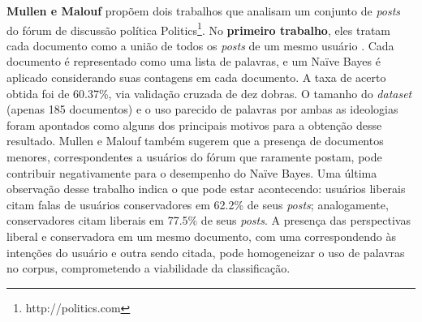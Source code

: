 \textbf{Mullen e Malouf} propõem dois trabalhos que analisam um conjunto de \emph{posts} do fórum de discussão política Politics\footnote{http://politics.com}. No \textbf{primeiro trabalho}, eles tratam cada documento como a união de todos os \emph{posts} de um mesmo usuário \cite{aaai-politics}. Cada documento é representado como uma lista de palavras, e um Naïve Bayes é aplicado considerando suas contagens em cada documento. A taxa de acerto obtida foi de 60.37\%, via validação cruzada de dez dobras. O tamanho do \emph{dataset} (apenas 185 documentos) e o uso parecido de palavras por ambas as ideologias foram apontados como alguns dos principais motivos para a obtenção desse resultado. Mullen e Malouf também sugerem que a presença de documentos menores, correspondentes a usuários do fórum que raramente postam, pode contribuir negativamente para o desempenho do Naïve Bayes. Uma última observação desse trabalho indica o que pode estar acontecendo: usuários liberais citam falas de usuários conservadores em 62.2\% de seus \emph{posts}; analogamente, conservadores citam liberais em 77.5\%  de seus \emph{posts}. A presença das perspectivas liberal e conservadora em um mesmo documento, com uma correspondendo às intenções do usuário e outra sendo citada, pode homogeneizar o uso de palavras no corpus, comprometendo a viabilidade da classificação.



